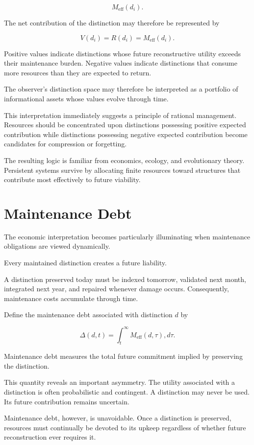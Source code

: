 \documentclass[12pt,oneside]{book}
\theoremstyle{plain} \newtheorem{theorem}{Theorem}[chapter] \newtheorem{lemma}[theorem]{Lemma} \newtheorem{proposition}[theorem]{Proposition} \newtheorem{corollary}[theorem]{Corollary}
\theoremstyle{definition} \newtheorem{definition}[theorem]{Definition} \newtheorem{axiom}[theorem]{Axiom} \newtheorem{construction}[theorem]{Construction}
\theoremstyle{remark} \newtheorem{remark}[theorem]{Remark} \newtheorem{example}[theorem]{Example}
\begin{document}
\[
M_{\mathrm{eff}}(d_i).
\]

The net contribution of the distinction may therefore be represented by

\[
V(d_i)
=
R(d_i)
=
M_{\mathrm{eff}}(d_i).
\]

Positive values indicate distinctions whose future reconstructive utility exceeds their maintenance burden. Negative values indicate distinctions that consume more resources than they are expected to return.

The observer's distinction space may therefore be interpreted as a portfolio of informational assets whose values evolve through time.

This interpretation immediately suggests a principle of rational management. Resources should be concentrated upon distinctions possessing positive expected contribution while distinctions possessing negative expected contribution become candidates for compression or forgetting.

The resulting logic is familiar from economics, ecology, and evolutionary theory. Persistent systems survive by allocating finite resources toward structures that contribute most effectively to future viability.

\section{Maintenance Debt}

The economic interpretation becomes particularly illuminating when maintenance obligations are viewed dynamically.

Every maintained distinction creates a future liability.

A distinction preserved today must be indexed tomorrow, validated next month, integrated next year, and repaired whenever damage occurs. Consequently, maintenance costs accumulate through time.

Define the maintenance debt associated with distinction $d$ by

\[
\Delta(d,t)
=
\int_t^\infty
M_{\mathrm{eff}}(d,\tau)
,d\tau.
\]

Maintenance debt measures the total future commitment implied by preserving the distinction.

This quantity reveals an important asymmetry. The utility associated with a distinction is often probabilistic and contingent. A distinction may never be used. Its future contribution remains uncertain.

Maintenance debt, however, is unavoidable. Once a distinction is preserved, resources must continually be devoted to its upkeep regardless of whether future reconstruction ever requires it.
\end{document}
